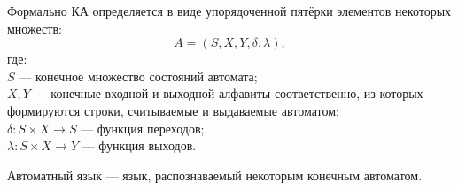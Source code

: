     
    
    \begin{Def}
        Формально КА определяется в виде упорядоченной пятёрки элементов некоторых множеств:
        $$ A=(S,X,Y,\delta ,\lambda ),$$
        где:\\
        $S$ --- конечное множество состояний автомата;\\
        $X, Y$ --- конечные входной и выходной алфавиты соответственно, из которых формируются строки, считываемые и выдаваемые автоматом;\\
        $\delta :S\times X\rightarrow S$ --- функция переходов;\\
        $\lambda :S\times X\rightarrow Y$ --- функция выходов.
    \end{Def}
    \begin{Def}
        Автоматный язык --- язык, распознаваемый некоторым конечным автоматом.
    \end{Def}
    
    

